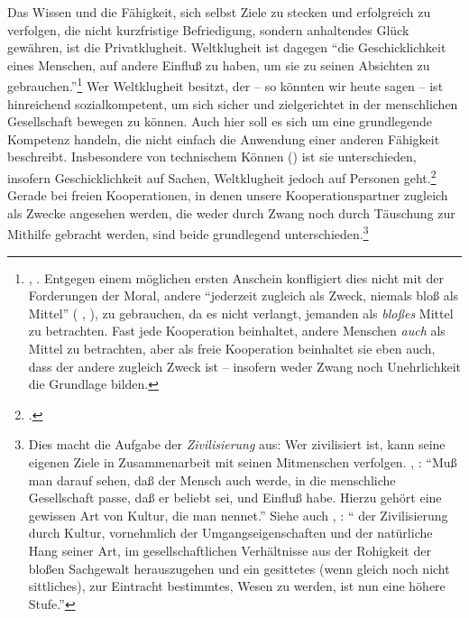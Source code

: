Das Wissen und die Fähigkeit, sich selbst Ziele zu
stecken und erfolgreich zu verfolgen, die nicht kurzfristige Befriedigung,
sondern anhaltendes Glück gewähren, ist die Privatklugheit. Weltklugheit ist
dagegen \enquote{die Geschicklichkeit eines Menschen, auf andere Einfluß zu
haben, um sie zu seinen Absichten zu
gebrauchen.}\footnote{\cite[BA 42]{Kant:GrundlegungzurMetaphysikderSitten1965},
\cite[IV: 416.32--33]{Kant:GesammelteWerke1900ff.}. Entgegen einem möglichen
ersten Anschein konfligiert dies nicht mit der Forderungen der Moral, andere
\enquote{jederzeit zugleich als Zweck, niemals bloß als
Mittel} \mkbibparens{\cite[BA
66\,f.,]{Kant:GrundlegungzurMetaphysikderSitten1965} \cite[IV:
429.11--12]{Kant:GesammelteWerke1900ff.}, \ohio}, zu gebrauchen, da es nicht
verlangt, jemanden als \emph{bloßes} Mittel zu betrachten. Fast jede Kooperation
beinhaltet, andere Menschen \emph{auch} als Mittel zu betrachten, aber als freie
Kooperation beinhaltet sie eben auch, dass der andere zugleich Zweck ist --
insofern weder Zwang noch Unehrlichkeit die Grundlage bilden.}
Wer Weltklugheit besitzt, der -- so könnten wir heute sagen -- ist hinreichend
sozialkompetent, um sich sicher und zielgerichtet in der menschlichen
Gesellschaft bewegen zu können. Auch hier soll es sich um eine grundlegende
Kompetenz handeln, die nicht einfach die Anwendung einer anderen Fähigkeit
beschreibt. Insbesondere von technischem Können ()
ist sie unterschieden, insofern Geschicklichkeit auf Sachen, Weltklugheit jedoch
auf Personen
geht.\footnote{\cite[Vgl.][128]{Schwaiger:KategorischeundandereImperative1999}.}
Gerade bei freien Kooperationen, in denen unsere Kooperationspartner zugleich
als Zwecke angesehen werden, die weder durch Zwang noch durch Täuschung zur
Mithilfe gebracht werden, sind beide grundlegend unterschieden.\footnote{Dies
macht die Aufgabe der \emph{Zivilisierung} aus: Wer zivilisiert ist, kann seine
eigenen Ziele in Zusammenarbeit mit seinen Mitmenschen verfolgen.
\cite[Vgl.][A~23]{Kant:UeberPaedagogik1977}, \cite[IX:
450.3-5]{Kant:GesammelteWerke1900ff.}: \enquote{Muß man darauf sehen, daß der
Mensch auch  werde, in die menschliche Gesellschaft passe, daß er
beliebt sei, und Einfluß habe. Hierzu gehört eine gewissen Art von Kultur, die
man  nennet.} Siehe auch
\cite[A~319]{Kant:AnthropologieinpragmatischerHinsicht1977},
\cite[VII: 323.21-25]{Kant:GesammelteWerke1900ff.}: \enquote{ der Zivilisierung durch Kultur, vornehmlich der Umgangseigenschaften und der
natürliche Hang seiner Art, im gesellschaftlichen Verhältnisse aus der Rohigkeit
der bloßen Sachgewalt herauszugehen und ein gesittetes (wenn gleich noch nicht
sittliches), zur Eintracht bestimmtes, Wesen zu werden, ist nun eine höhere
Stufe.}}


